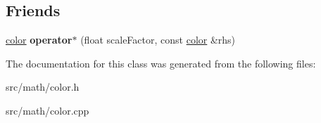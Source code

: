 \subsection*{Friends}
\begin{DoxyCompactItemize}
\item 
\hypertarget{classmath_1_1color_ac8a5053628a637175fc8fe0e8bf9d1f6}{
\hyperlink{classmath_1_1color}{color} {\bfseries operator$\ast$} (float scaleFactor, const \hyperlink{classmath_1_1color}{color} \&rhs)}
\label{classmath_1_1color_ac8a5053628a637175fc8fe0e8bf9d1f6}

\end{DoxyCompactItemize}


The documentation for this class was generated from the following files:\begin{DoxyCompactItemize}
\item 
src/math/color.h\item 
src/math/color.cpp\end{DoxyCompactItemize}
